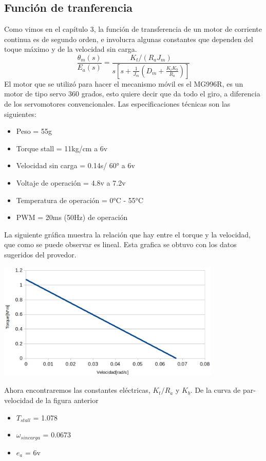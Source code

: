\subsection{Función de tranferencia}
Como vimos en el capítulo 3, la función de transferencia de un motor de corriente continua es de segundo orden, e involucra algunas constantes que dependen del toque máximo y
de la velocidad sin carga.
\begin{equation}
	\frac{\theta_m (s)}{E_a(s)} = \frac{K_t / (R_aJ_m)}{s \left[ s + \frac{1}{J_m} \left( D_m + \frac{K_tK_b}{R_a} \right) \right]}
\end{equation}
El motor que se utilizó para hacer el mecanismo móvil es el MG996R, es un motor de tipo servo 360 grados, esto quiere decir que da todo el giro, a diferencia de los servomotores
convencionales. Las especificaciones técnicas son las siguientes:
\begin{itemize}
	\item Peso = 55g
	\item Torque stall = 11kg/cm a 6v
	\item Velocidad sin carga = 0.14s/ 60° a 6v
	\item Voltaje de operación = 4.8v a 7.2v
	\item Temperatura de operación = 0°C - 55°C
	\item PWM = 20ms (50Hz) de operación
\end{itemize}
La siguiente gráfica muestra la relación que hay entre el torque y la velocidad, que como se puede observar es lineal. Esta grafica se obtuvo con los datos sugeridos del
provedor.
\begin{center}
	\includegraphics[width=0.8\textwidth]{Contenido/Cuerpo/Capitulo5/Fig19.eps}
	\label{Fig4}
\end{center}
Ahora encontraremos las constantes eléctricas, $K_t / R_a$ y $K_b$. De la curva de par-velocidad de la figura anterior
\begin{itemize}
	\item $T_{stall}$ = 1.078
	\item $\omega_{sincarga}$ = 0.0673
	\item $e_a$ = 6v
\end{itemize}
